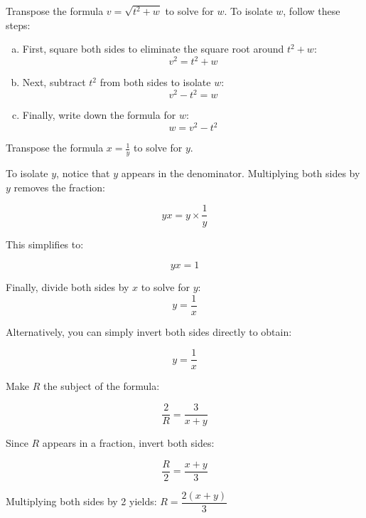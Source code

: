 \begin{problem}
Transpose the formula \(v = \sqrt{t^2 + w}\) to solve for \(w\). To isolate \(w\), follow these steps:   
\end{problem}

    \begin{enumerate}[a.]
        \item First, square both sides to eliminate the square root around \(t^2 + w\):
        \[
        v^2 = t^2 + w
        \]

        \item Next, subtract \(t^2\) from both sides to isolate \(w\):
        \[
        v^2 - t^2 = w
        \]

        \item Finally, write down the formula for \(w\):
        \[
        w = v^2 - t^2
        \]
    \end{enumerate}

\begin{example} Transpose the formula \(x = \frac{1}{y}\) to solve for \(y\).

\begin{solution}
To isolate \(y\), notice that \(y\) appears in the denominator. Multiplying both sides by \(y\) removes the fraction:

\[
yx = y \times \frac{1}{y}
\]

This simplifies to:

\[
yx = 1
\]

Finally, divide both sides by \(x\) to solve for \(y\):
\[
y = \frac{1}{x}
\]

Alternatively, you can simply invert both sides directly to obtain:

\[
y = \frac{1}{x}
\]    
\end{solution}


\end{example}


\begin{example} Make \(R\) the subject of the formula:

\[
\frac{2}{R} = \frac{3}{x + y}
\]

\begin{solution} Since \(R\) appears in a fraction, invert both sides:

\[
\frac{R}{2} = \frac{x + y}{3}
\]

Multiplying both sides by 2 yields: $R = \dfrac{2(x + y)}{3}$    
\end{solution}
    
\end{example} 

